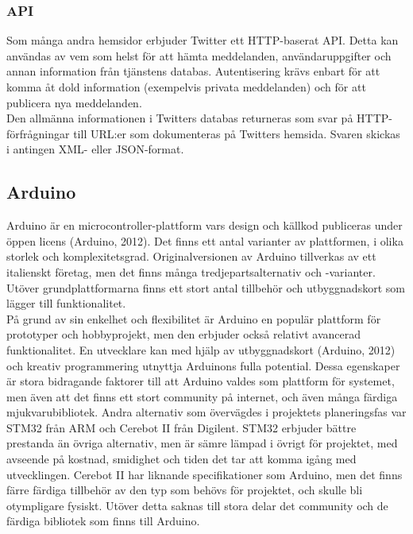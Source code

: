 \documentclass[a4paper,11pt]{article}
\begin{document}
\subsubsection{API}
Som många andra hemsidor erbjuder Twitter ett HTTP-baserat API. Detta kan användas av vem som helst för att hämta meddelanden, användaruppgifter och annan information från tjänstens databas. Autentisering krävs enbart för att komma åt dold information (exempelvis privata meddelanden) och för att publicera nya meddelanden. \\

Den allmänna informationen i Twitters databas returneras som svar på HTTP-förfrågningar till URL:er som dokumenteras på Twitters hemsida. Svaren skickas i antingen XML- eller JSON-format.

\subsection{Arduino}
Arduino är en microcontroller-plattform vars design och källkod publiceras under öppen licens (Arduino, 2012). Det finns ett antal varianter av plattformen, i olika storlek och komplexitetsgrad. Originalversionen av Arduino tillverkas av ett italienskt företag, men det finns många tredjepartsalternativ och -varianter. Utöver grundplattformarna finns ett stort antal tillbehör och utbyggnadskort som lägger till funktionalitet. \\

På grund av sin enkelhet och flexibilitet är Arduino en populär plattform för prototyper och hobbyprojekt, men den erbjuder också relativt avancerad funktionalitet. En utvecklare kan med hjälp av utbyggnadskort (Arduino, 2012) och kreativ programmering utnyttja Arduinons fulla potential. Dessa egenskaper är stora bidragande faktorer till att Arduino valdes som plattform för systemet, men även att det finns ett stort community på internet, och även många färdiga mjukvarubibliotek. Andra alternativ som övervägdes i projektets planeringsfas var STM32 från ARM och Cerebot II från Digilent. STM32 erbjuder bättre prestanda än övriga alternativ, men är sämre lämpad i övrigt för projektet, med avseende på kostnad, smidighet och tiden det tar att komma igång med utvecklingen. Cerebot II har liknande specifikationer som Arduino, men det finns färre färdiga tillbehör av den typ som behövs för projektet, och skulle bli otympligare fysiskt. Utöver detta saknas till stora delar det community och de färdiga bibliotek som finns till Arduino. \\
\end{document}

